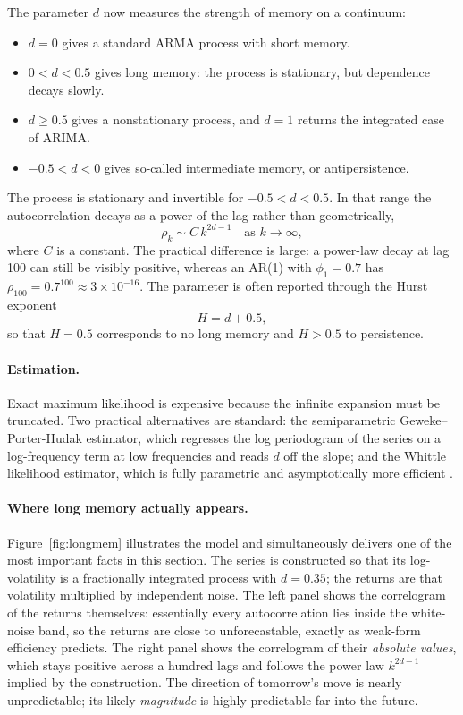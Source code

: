 \documentclass[12pt,a4paper]{article}
\begin{document}
The parameter $d$ now measures the strength of memory on a continuum:
\begin{itemize}
\item $d = 0$ gives a standard ARMA process with short memory.
\item $0 < d < 0.5$ gives long memory: the process is stationary, but
      dependence decays slowly.
\item $d \ge 0.5$ gives a nonstationary process, and $d = 1$ returns the
      integrated case of ARIMA.
\item $-0.5 < d < 0$ gives so-called intermediate memory, or antipersistence.
\end{itemize}
The process is stationary and invertible for $-0.5 < d < 0.5$. In that range
the autocorrelation decays as a power of the lag rather than geometrically,
\begin{equation}
\rho_k \sim C\,k^{2d-1} \quad \text{as } k \to \infty,
\end{equation}
where $C$ is a constant. The practical difference is large: a power-law decay
at lag 100 can still be visibly positive, whereas an AR(1) with $\phi_1 = 0.7$
has $\rho_{100} = 0.7^{100} \approx 3\times10^{-16}$. The parameter is often
reported through the Hurst exponent
\begin{equation}
H = d + 0.5 ,
\end{equation}
so that $H = 0.5$ corresponds to no long memory and $H > 0.5$ to persistence.

\paragraph{Estimation.} Exact maximum likelihood is expensive because the
infinite expansion must be truncated. Two practical alternatives are standard:
the semiparametric Geweke--Porter-Hudak estimator, which regresses the log
periodogram of the series on a log-frequency term at low frequencies and reads
$d$ off the slope; and the Whittle likelihood estimator, which is fully
parametric and asymptotically more efficient \cite{Granger_1980}.

\paragraph{Where long memory actually appears.} Figure~\ref{fig:longmem}
illustrates the model and simultaneously delivers one of the most important
facts in this section. The series is constructed so that its log-volatility is
a fractionally integrated process with $d = 0.35$; the returns are that
volatility multiplied by independent noise. The left panel shows the
correlogram of the returns themselves: essentially every autocorrelation lies
inside the white-noise band, so the returns are close to unforecastable,
exactly as weak-form efficiency predicts. The right panel shows the
correlogram of their \emph{absolute values}, which stays positive across a
hundred lags and follows the power law $k^{2d-1}$ implied by the construction.
The direction of tomorrow's move is nearly unpredictable; its likely
\emph{magnitude} is highly predictable far into the future.
\end{document}

